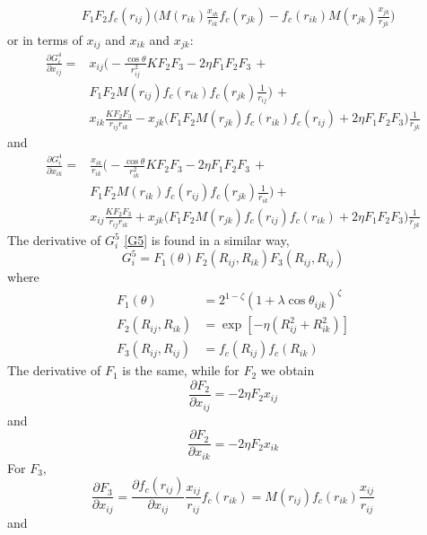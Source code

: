 \documentclass[twoside,english]{uiofysmaster}
\begin{document}
\begin{appendices}
\begin{align}
 &F_1F_2 f_c(r_{ij})\Biggr(M(r_{ik})\frac{x_{ik}}{r_{ik}}f_c(r_{jk}) - 
 f_c(r_{ik}) M(r_{jk})\frac{x_{jk}}{r_{jk}} \Biggr)
\end{align}
or in terms of $x_{ij}$ and $x_{ik}$ and $x_{jk}$:
\begin{align}
 \frac{\partial G_i^4}{\partial x_{ij}} = &x_{ij} \biggr(-\frac{\cos\theta}{r_{ij}^2}K
 F_2F_3 - 2\eta F_1F_2F_3 \, + \\ 
 &F_1F_2M(r_{ij})f_c(r_{ik})f_c(r_{jk})\frac{1}{r_{ij}}\biggr) \, + \\
 &x_{ik}\frac{KF_2F_3}{r_{ij}r_{ik}} - x_{jk}\Bigr(F_1F_2M(r_{jk})f_c(r_{ik})f_c(r_{ij}) + 2\eta F_1F_2F_3\Bigr)\frac{1}{r_{jk}}
\end{align}
and 
\begin{align}
 \frac{\partial G_i^4}{\partial x_{ik}} = &\frac{x_{ik}}{r_{ik}} \biggr(-\frac{\cos\theta}{r_{ik}^2}K
 F_2F_3 - 2\eta F_1F_2F_3 \, + \, \\
 &F_1F_2M(r_{ik})f_c(r_{ij})f_c(r_{jk})\frac{1}{r_{ik}}\biggr) + \, \\
 &x_{ij}\frac{KF_2F_3}{r_{ij}r_{ik}} + x_{jk}\Bigr(F_1F_2M(r_{jk})f_c(r_{ij})f_c(r_{ik}) + 2\eta F_1F_2F_3\Bigr)\frac{1}{r_{jk}}
\end{align}
The derivative of $G_i^5$ \eqref{G5} is found in a similar way,
\begin{equation}
 G_i^5 = F_1(\theta)F_2(R_{ij},R_{ik})F_3(R_{ij},R_{ij})
\end{equation}
where 
\begin{align}
 F_1(\theta) &= 2^{1-\zeta}(1 + \lambda \cos\theta_{ijk})^\zeta \\
 F_2(R_{ij},R_{ik}) &= \exp[-\eta (R_{ij}^2 + R_{ik}^2)] \\
 F_3(R_{ij},R_{ij}) &= f_c(R_{ij}) f_c(R_{ik})
\end{align}
The derivative of $F_1$ is the same, while for $F_2$ we obtain
\begin{equation}
 \frac{\partial F_2}{\partial x_{ij}} = -2\eta F_2 x_{ij}
\end{equation}
and
\begin{equation}
 \frac{\partial F_2}{\partial x_{ik}} = -2\eta F_2 x_{ik}
\end{equation}
For $F_3$, 
\begin{equation}
 \frac{\partial F_3}{\partial x_{ij}} = \frac{\partial f_c(r_{ij})}{\partial x_{ij}}\frac{x_{ij}}{r_{ij}}
 f_c(r_{ik}) = M(r_{ij})f_c(r_{ik})\frac{x_{ij}}{r_{ij}}
\end{equation}
and
\begin{equation}

\end{equation}
\end{appendices}
\end{document}
